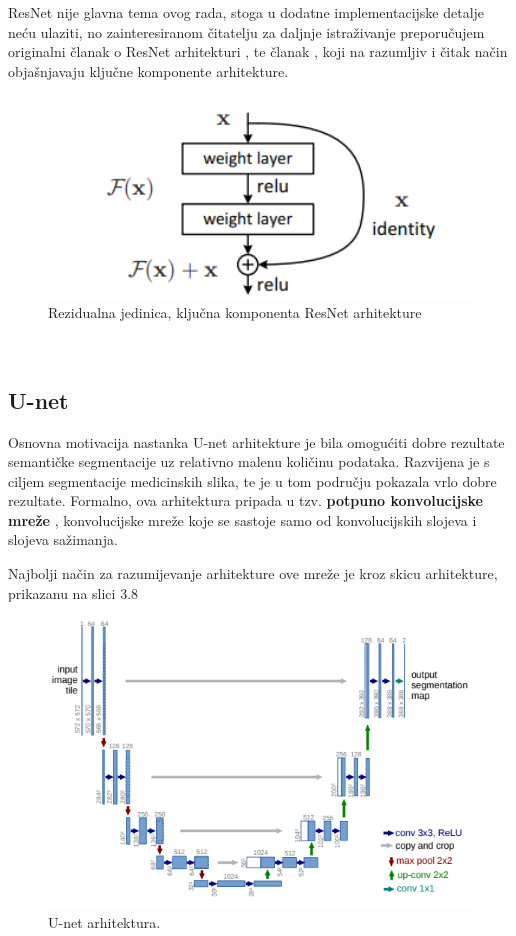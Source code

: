 ResNet nije glavna tema ovog rada, stoga u dodatne implementacijske detalje neću ulaziti, no zainteresiranom čitatelju za daljnje istraživanje preporučujem originalni članak o ResNet arhitekturi \citep{resnetOriginal}, te članak \citep{resnetDecodingArhitecture}, koji na razumljiv i čitak način objašnjavaju ključne komponente arhitekture.

\begin{figure}[htb]
\centering
\includegraphics[width=13cm]{slike/resnet.png}
\caption{Rezidualna jedinica, ključna komponenta ResNet arhitekture \citep{resnetOriginal}}
\label{fig:fer-logo}
\end{figure}
\textbf{}\\


\subsection{U-net}
Osnovna motivacija nastanka U-net arhitekture je bila omogućiti dobre rezultate semantičke segmentacije uz relativno malenu količinu podataka. Razvijena je s ciljem segmentacije medicinskih slika, te je u tom području pokazala vrlo dobre rezultate. Formalno, ova arhitektura pripada u tzv. \textbf{potpuno konvolucijske mreže} , konvolucijske mreže koje se sastoje samo od konvolucijskih slojeva i slojeva sažimanja.

Najbolji način za razumijevanje arhitekture ove mreže je kroz skicu arhitekture, prikazanu na slici 3.8

\begin{figure}[htb]
\centering
\includegraphics[width=13cm]{slike/unet.png}
\caption{U-net arhitektura. \citep{unetOriginal}}
\label{fig:fer-logo}
\end{figure}
\textbf{}

